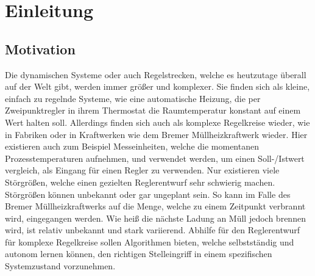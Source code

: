 \documentclass[]{iat}
\begin{document}
\graphicspath{{./project_graphics/}}



\tableofcontents

\newpage

\chapter{Einleitung} \label{sec:einleitung}
\section{Motivation} \label{sec:motivation}
Die dynamischen Systeme oder auch Regelstrecken, welche es heutzutage überall auf der Welt gibt, werden immer größer und komplexer. Sie finden sich als kleine, einfach zu regelnde Systeme, wie eine automatische Heizung, die per Zweipunktregler in ihrem Thermostat die Raumtemperatur konstant auf einem Wert halten soll. Allerdings finden sich auch als komplexe Regelkreise wieder, wie in Fabriken oder in Kraftwerken wie dem Bremer Müllheizkraftwerk wieder. Hier existieren auch zum Beispiel Messeinheiten, welche die momentanen Prozesstemperaturen aufnehmen, und verwendet werden, um einen Soll-/Istwert vergleich, als Eingang für einen Regler zu verwenden. Nur existieren viele Störgrößen, welche einen gezielten Reglerentwurf sehr schwierig machen. Störgrößen können unbekannt oder gar ungeplant sein. So kann im Falle des Bremer Müllheizkraftwerks auf die Menge, welche zu einem Zeitpunkt verbrannt wird, eingegangen werden. Wie heiß die nächste Ladung an Müll jedoch brennen wird, ist relativ unbekannt und stark variierend. Abhilfe für den Reglerentwurf für komplexe Regelkreise sollen Algorithmen bieten, welche selbstständig und autonom lernen können, den richtigen Stelleingriff in einem spezifischen Systemzustand vorzunehmen.
\end{document}
